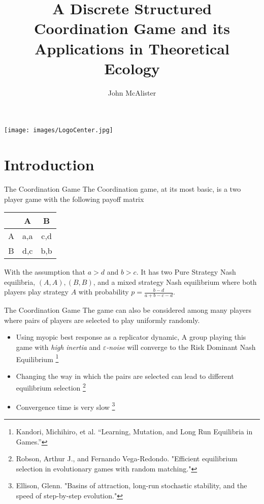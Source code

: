 \documentclass{beamer}
\title{A Discrete Structured Coordination Game and its Applications in Theoretical Ecology}
\author{John McAlister}
\institute[Fefferman Lab]{Univeristy of Tennessee - Knoxville}
\begin{document}
	\begin{frame}[plain]
		\centering
		\maketitle
		\texttt{[image: images/LogoCenter.jpg]}
	\end{frame}
\section{Introduction}
\begin{frame}{The Coordination Game}
	The Coordination game, at its most basic, is a two player game with the following payoff matrix
	\begin{center} 
		\begin{tabular}{c|cc}
			&A&B\\
			\hline 
			A&a,a&c,d\\
			B&d,c&b,b
		\end{tabular}
	\end{center}
	
	With the assumption that $a>d$ and $b>c$. It has two Pure Strategy Nash equilibria, $(A,A), (B,B)$, and a mixed strategy Nash equilibrium where both players play strategy $A$ with probability $p=\frac{b-d}{a+b-c-d}$.
\end{frame}
\begin{frame}{The Coordination Game}
	The game can also be considered among many players where pairs of players are selected to play uniformly randomly.
	\begin{itemize}
		\item Using myopic best response as a replicator dynamic, A group playing this game with \textit{high inertia} and $\varepsilon$\textit{-noise} will converge to the Risk Dominant Nash Equilibrium \footnote{Kandori, Michihiro, et al. “Learning, Mutation, and Long Run Equilibria in Games.”}
		
		\item Changing the way in which the pairs are selected can lead to different equilibrium selection \footnote{Robson, Arthur J., and Fernando Vega-Redondo. "Efficient equilibrium selection in evolutionary games with random matching."}
		
		\item Convergence time is very slow \footnote{Ellison, Glenn. "Basins of attraction, long-run stochastic stability, and the speed of step-by-step evolution."}
	\end{itemize}
\end{frame}
\end{document}
